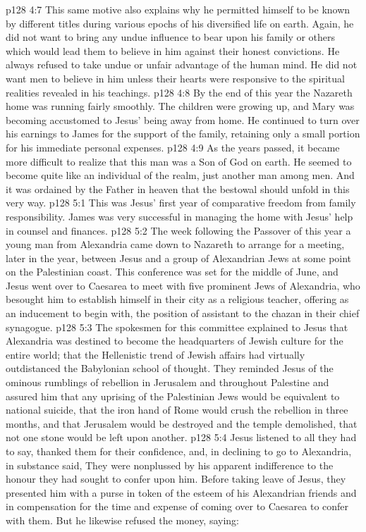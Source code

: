 \vs p128 4:7 This same motive also explains why he permitted himself to be known by different titles during various epochs of his diversified life on earth. Again, he did not want to bring any undue influence to bear upon his family or others which would lead them to believe in him against their honest convictions. He always refused to take undue or unfair advantage of the human mind. He did not want men to believe in him unless their hearts were responsive to the spiritual realities revealed in his teachings.
\vs p128 4:8 \pc By the end of this year the Nazareth home was running fairly smoothly. The children were growing up, and Mary was becoming accustomed to Jesus’ being away from home. He continued to turn over his earnings to James for the support of the family, retaining only a small portion for his immediate personal expenses.
\vs p128 4:9 As the years passed, it became more difficult to realize that this man was a Son of God on earth. He seemed to become quite like an individual of the realm, just another man among men. And it was ordained by the Father in heaven that the bestowal should unfold in this very way.
\vs p128 5:1 This was Jesus’ first year of comparative freedom from family responsibility. James was very successful in managing the home with Jesus’ help in counsel and finances.
\vs p128 5:2 \pc The week following the Passover of this year a young man from Alexandria came down to Nazareth to arrange for a meeting, later in the year, between Jesus and a group of Alexandrian Jews at some point on the Palestinian coast. This conference was set for the middle of June, and Jesus went over to Caesarea to meet with five prominent Jews of Alexandria, who besought him to establish himself in their city as a religious teacher, offering as an inducement to begin with, the position of assistant to the chazan in their chief synagogue.
\vs p128 5:3 The spokesmen for this committee explained to Jesus that Alexandria was destined to become the headquarters of Jewish culture for the entire world; that the Hellenistic trend of Jewish affairs had virtually outdistanced the Babylonian school of thought. They reminded Jesus of the ominous rumblings of rebellion in Jerusalem and throughout Palestine and assured him that any uprising of the Palestinian Jews would be equivalent to national suicide, that the iron hand of Rome would crush the rebellion in three months, and that Jerusalem would be destroyed and the temple demolished, that not one stone would be left upon another.
\vs p128 5:4 Jesus listened to all they had to say, thanked them for their confidence, and, in declining to go to Alexandria, in substance said,  They were nonplussed by his apparent indifference to the honour they had sought to confer upon him. Before taking leave of Jesus, they presented him with a purse in token of the esteem of his Alexandrian friends and in compensation for the time and expense of coming over to Caesarea to confer with them. But he likewise refused the money, saying: 
